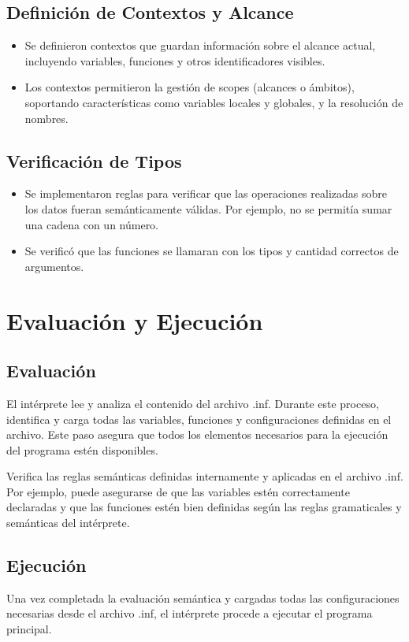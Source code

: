 \subsection{Definición de Contextos y Alcance}
\begin{itemize}
  \item Se definieron contextos que guardan información sobre el alcance actual, incluyendo variables, funciones y otros identificadores visibles.
  \item Los contextos permitieron la gestión de scopes (alcances o ámbitos), soportando características como variables locales y globales, y la resolución de nombres.
\end{itemize}

\subsection{Verificación de Tipos}
\begin{itemize}
  \item Se implementaron reglas para verificar que las operaciones realizadas sobre los datos fueran semánticamente válidas. Por ejemplo, no se permitía sumar una cadena con un número.
  \item Se verificó que las funciones se llamaran con los tipos y cantidad correctos de argumentos.
\end{itemize}

\section{Evaluación y Ejecución}
\subsection{Evaluación}
El intérprete lee y analiza el contenido del archivo .inf. Durante este proceso, identifica y carga todas las variables, funciones y configuraciones definidas en el archivo. Este paso asegura que todos los elementos necesarios para la ejecución del programa estén disponibles.

Verifica las reglas semánticas definidas internamente y aplicadas en el archivo .inf. Por ejemplo, puede asegurarse de que las variables estén correctamente declaradas y que las funciones estén bien definidas según las reglas gramaticales y semánticas del intérprete.

\subsection{Ejecución}
Una vez completada la evaluación semántica y cargadas todas las configuraciones necesarias desde el archivo .inf, el intérprete procede a ejecutar el programa principal.


